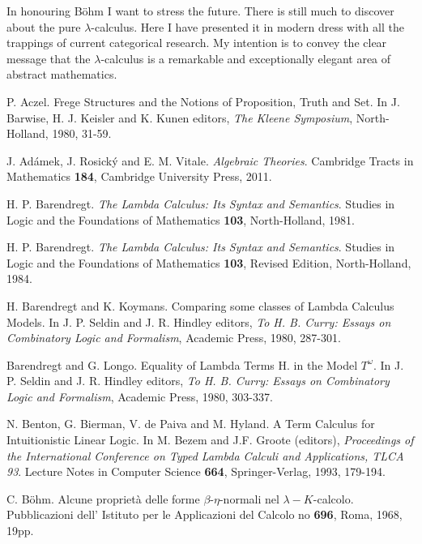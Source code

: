 \documentclass[12pt, amstex, amssymb]{article}
\begin{document}
In honouring B\"{o}hm I want to stress the future.
There is still much to discover about the 
pure $\lambda$-calculus. Here I have presented it in modern
dress with all the trappings of current categorical
research. My intention is to convey the clear message 
that the $\lambda$-calculus is a remarkable 
and exceptionally elegant area of abstract mathematics.

\begin{thebibliography}{length}

P. Aczel. Frege Structures and the Notions of Proposition,
Truth and Set.
In J. Barwise, H. J. Keisler and K. Kunen editors,
{\it The Kleene Symposium},
North-Holland, 1980, 31-59. 

J. {Ad\'{a}mek}, J. {Rosick\'{y}} and E. M. Vitale.
{\em Algebraic Theories}.
Cambridge Tracts in Mathematics {\bf 184}, Cambridge University Press,
2011.

H. P. Barendregt. {\em The Lambda Calculus: Its Syntax 
and Semantics}.
Studies in Logic and the Foundations of Mathematics {\bf 103},
North-Holland, 1981.


H. P. Barendregt. 
{\em The Lambda Calculus: Its Syntax and Semantics}.
Studies in Logic and the Foundations of Mathematics {\bf 103}, 
Revised Edition, 
North-Holland, 1984.

H. Barendregt and K. Koymans. Comparing some classes of
Lambda Calculus Models. In J. P. Seldin and J. R.  Hindley editors,
{\it To H. B. Curry: Essays on Combinatory Logic and Formalism},
Academic Press, 1980, 287-301.

Barendregt and G. Longo. Equality of Lambda Terms
H. in the Model $T^{\omega}$. In J. P. Seldin and J. R.  Hindley editors,
{\it To H. B. Curry: Essays on Combinatory Logic and Formalism},
Academic Press, 1980, 303-337.

N. Benton, G. Bierman, V. de Paiva and M. Hyland. 
A Term Calculus for Intuitionistic Linear Logic.
In M. Bezem and J.F. Groote (editors), {\it Proceedings of the 
International Conference on Typed Lambda Calculi and 
Applications, TLCA 93}. Lecture Notes in Computer Science 
{\bf 664}, 
Springer-Verlag, 1993, 179-194.


C. B\"{o}hm. Alcune propriet\`{a} delle forme $\beta$-$\eta$-normali
nel $\lambda - K$-calcolo. Pubblicazioni dell' Istituto per le Applicazioni 
del Calcolo no {\bf 696}, Roma, 1968, 19pp.


\end{thebibliography}
\end{document}
